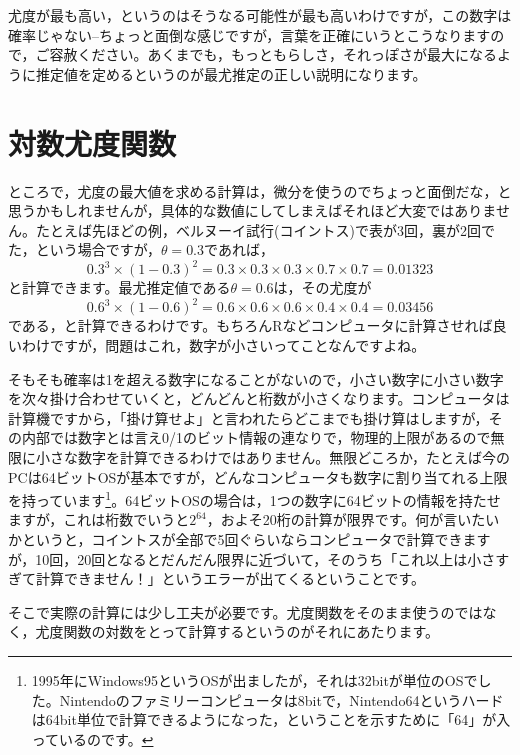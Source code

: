 \documentclass{ltjsbook}
\begin{document}
尤度が最も高い，というのはそうなる可能性が最も高いわけですが，この数字は確率じゃない--ちょっと面倒な感じですが，言葉を正確にいうとこうなりますので，ご容赦ください。あくまでも，もっともらしさ，それっぽさが最大になるように推定値を定めるというのが最尤推定の正しい説明になります。
\section{対数尤度関数}
ところで，尤度の最大値を求める計算は，微分を使うのでちょっと面倒だな，と思うかもしれませんが，具体的な数値にしてしまえばそれほど大変ではありません。たとえば先ほどの例，ベルヌーイ試行(コイントス)で表が3回，裏が2回でた，という場合ですが，$\theta=0.3$であれば，
\[ 0.3^3 \times (1-0.3)^2 = 0.3 \times 0.3 \times 0.3 \times 0.7 \times 0.7 = 0.01323 \]
と計算できます。最尤推定値である$\theta=0.6$は，その尤度が
\[ 0.6^3 \times (1-0.6)^2 = 0.6 \times 0.6 \times 0.6 \times 0.4 \times 0.4 = 0.03456 \]
である，と計算できるわけです。もちろんRなどコンピュータに計算させれば良いわけですが，問題はこれ，数字が小さいってことなんですよね。

そもそも確率は1を超える数字になることがないので，小さい数字に小さい数字を次々掛け合わせていくと，どんどんと桁数が小さくなります。コンピュータは計算機ですから，「掛け算せよ」と言われたらどこまでも掛け算はしますが，その内部では数字とは言え0/1のビット情報の連なりで，物理的上限があるので無限に小さな数字を計算できるわけではありません。無限どころか，たとえば今のPCは64ビットOSが基本ですが，どんなコンピュータも数字に割り当てれる上限を持っています\footnote{1995年にWindows95というOSが出ましたが，それは32bitが単位のOSでした。Nintendoのファミリーコンピュータは8bitで，Nintendo64というハードは64bit単位で計算できるようになった，ということを示すために「64」が入っているのです。}。64ビットOSの場合は，1つの数字に64ビットの情報を持たせますが，これは桁数でいうと$2^{64}$，およそ20桁の計算が限界です。何が言いたいかというと，コイントスが全部で5回ぐらいならコンピュータで計算できますが，10回，20回となるとだんだん限界に近づいて，そのうち「これ以上は小さすぎて計算できません！」というエラーが出てくるということです。

そこで実際の計算には少し工夫が必要です。尤度関数をそのまま使うのではなく，尤度関数の対数をとって計算するというのがそれにあたります。
\end{document}
